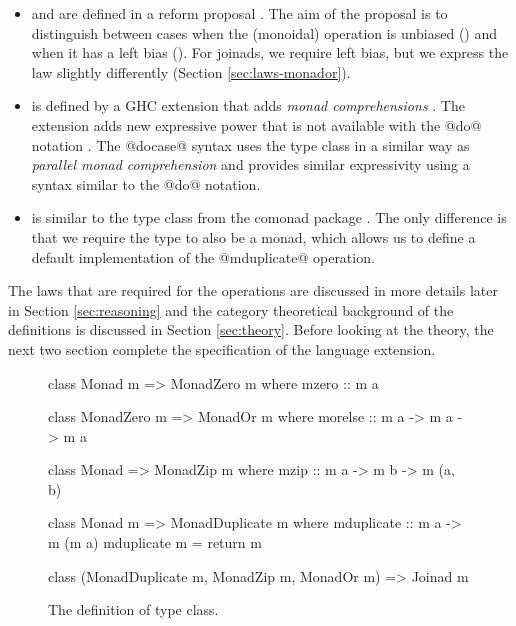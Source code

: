 \documentclass[preprint]{sigplanconf}
\begin{document}
\begin{itemize}
\item {} and  are defined in a  reform proposal
\cite{monadplusreform}. The aim of the proposal is to distinguish between cases when the (monoidal)
operation is unbiased () and when it has a left bias (). For joinads,
we require left bias, but we express the law slightly differently (Section \ref{sec:laws-monador}).

\item {} is defined by a GHC extension that adds \textit{monad comprehensions}
\cite{bringbackmc, comprefun}. The extension adds new expressive power that is not available with 
the @do@ notation \cite{parcomprefun}. The @docase@ syntax uses the type class in a similar way as
\textit{parallel monad comprehension} and provides similar expressivity using a syntax similar to 
the @do@ notation.

\item {} is similar to the  type class from the comonad 
package \cite{comonadpkg}. The only difference is that we require the type to also be a monad,
which allows us to define a default implementation of the @mduplicate@ operation. 

\end{itemize}
The laws that are required for the operations are discussed in more details later in Section
\ref{sec:reasoning} and the category theoretical background of the definitions is discussed in
Section \ref{sec:theory}. Before looking at the theory, the next two section complete the 
specification of the language extension.

\begin{figure}
\begin{code}
class Monad m => MonadZero m where
   mzero :: m a

class MonadZero m => MonadOr m where
   morelse :: m a -> m a -> m a

class Monad => MonadZip m where
  mzip :: m a -> m b -> m (a, b)

class Monad m => MonadDuplicate m where
  mduplicate :: m a -> m (m a)
  mduplicate m = return m

class (MonadDuplicate m, MonadZip m, MonadOr m) 
  => Joinad m
\end{code}
\caption{ The definition of  type class. }
\label{fig:joinad-classes}
\end{figure}
\end{document}
